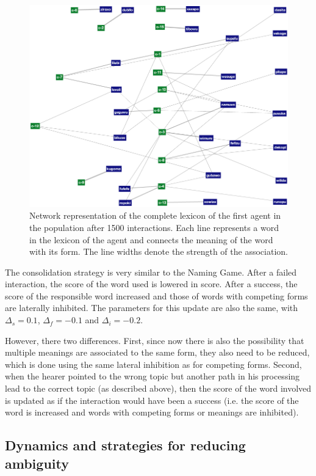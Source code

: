 \begin{figure}[t]
  \includegraphics[scale=0.5]{figures/sgg-sw-unstructured-lexicon-1500}
  \caption{Network representation of the complete lexicon of the first
    agent in the population after 1500 interactions. Each line
    represents a word in the lexicon of the agent and connects the
    meaning of the word with its form. The line widths denote the
    strength of the association. }
  \label{f:sgg-sw-unstructured-lexicon-1500}
\end{figure}

 The consolidation strategy is very similar
to the Naming Game. After a failed interaction, the score of the word
used is lowered in score. After a success, the score of the
responsible word increased and those of words with competing forms are
laterally inhibited. The parameters for this update are also the same,
with $\Delta_s=0.1$, $\Delta_f=-0.1$ and $\Delta_i=-0.2$. 

However, there two differences. First, since now there is also the
possibility that multiple meanings are associated to the same form,
they also need to be reduced, which is done using the same lateral
inhibition as for competing forms. Second, when the hearer pointed to
the wrong topic but another path in his processing lead to the correct
topic (as described above), then the score of the word involved is
updated as if the interaction would have been a success (i.e. the
score of the word is increased and words with competing forms or
meanings are inhibited).


\subsection{Dynamics and strategies for reducing ambiguity}
\label{s:sgg-sw-unstructed-strategies}


